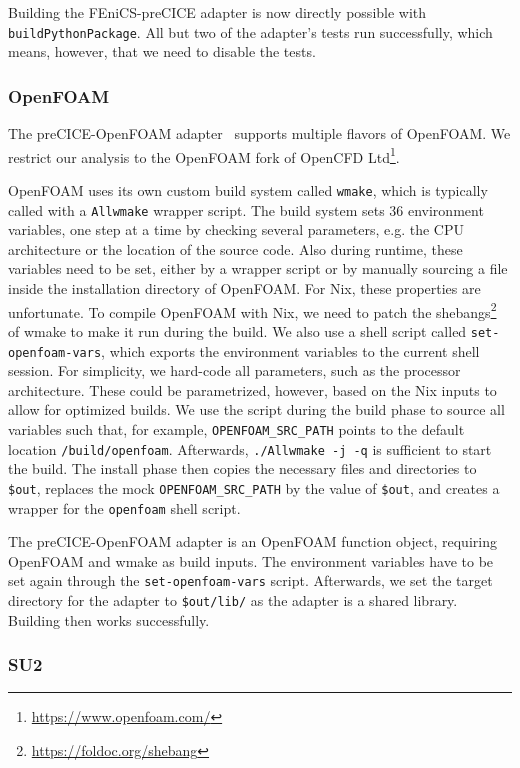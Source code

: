 \documentclass{eceasst}
\begin{document}
Building the FEniCS-preCICE adapter is now directly possible with \texttt{buildPythonPackage}.
All but two of the adapter's tests run successfully, which means, however, that we need to disable the tests.

\subsubsection{OpenFOAM}

The preCICE-OpenFOAM adapter~\cite{OpenFOAMpreCICE} supports multiple flavors of OpenFOAM. We restrict our analysis to the OpenFOAM fork of OpenCFD Ltd\footnote{\url{https://www.openfoam.com/}}.

OpenFOAM uses its own custom build system called \texttt{wmake}, which is typically called with a \texttt{Allwmake} wrapper script.
The build system sets 36 environment variables, one step at a time by checking several parameters, e.g. the CPU architecture or the location of the source code. Also during runtime, these variables need to be set, either by a wrapper script or by manually sourcing a file inside the installation directory of OpenFOAM.
For Nix, these properties are unfortunate. To compile OpenFOAM with Nix, we need to patch the shebangs\footnote{\url{https://foldoc.org/shebang}} of wmake to make it run during the build.
We also use a shell script called \texttt{set-openfoam-vars}, which exports the environment variables to the current shell session.
For simplicity, we hard-code all parameters, such as the processor architecture. These could be parametrized, however, based on the Nix inputs to allow for optimized builds. We use the script during the build phase to source all variables such that, for example, \texttt{OPENFOAM\_SRC\_PATH} points to the default location \texttt{/build/openfoam}.
Afterwards, \texttt{./Allwmake -j -q} is sufficient to start the build.
The install phase then copies the necessary files and directories to \texttt{\$out}, replaces the mock \texttt{OPENFOAM\_SRC\_PATH} by the value of \texttt{\$out}, and creates a wrapper for the \texttt{openfoam} shell script.

The preCICE-OpenFOAM adapter is an OpenFOAM function object, requiring OpenFOAM and wmake as build inputs.
The environment variables have to be set again through the \texttt{set-openfoam-vars} script.
Afterwards, we set the target directory for the adapter to \texttt{\$out/lib/} as the adapter is a shared library. Building then works successfully.

\subsubsection{SU2}
\end{document}
